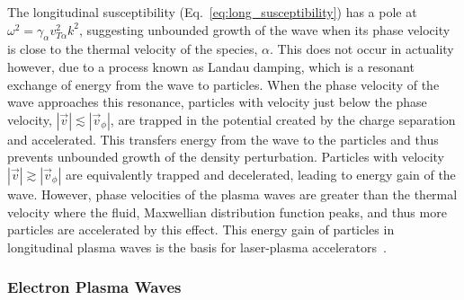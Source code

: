 The longitudinal susceptibility (Eq.~\ref{eq:long_susceptibility}) has a pole at $\omega^2 = \gamma_\alpha v_{T\alpha}^2 k^2$, suggesting unbounded growth of the wave when its phase velocity is close to the thermal velocity of the species, $\alpha$.
This does not occur in actuality however, due to a process known as Landau damping, which is a resonant exchange of energy from the wave to particles.
When the phase velocity of the wave approaches this resonance, particles with velocity just below the phase velocity, $|\vec{v}|\lesssim|\vec{v}_\phi|$, are trapped in the potential created by the charge separation and accelerated.
This transfers energy from the wave to the particles and thus prevents unbounded growth of the density perturbation.
Particles with velocity $|\vec{v}|\gtrsim|\vec{v}_\phi|$ are equivalently trapped and decelerated, leading to energy gain of the wave.
However, phase velocities of the plasma waves are greater than the thermal velocity where the fluid, Maxwellian distribution function peaks, and thus more particles are accelerated by this effect.
This energy gain of particles in longitudinal plasma waves is the basis for laser-plasma accelerators~\cite{tajima_laser_1979,esarey_physics_2009}.

\subsubsection{Electron Plasma Waves}%
\label{sec:theory_EPWs}

